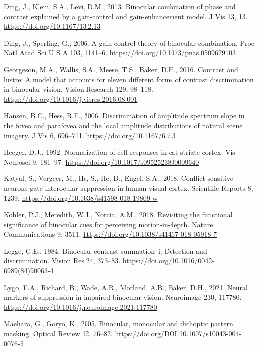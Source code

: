 \documentclass[
  12pt,
]{article}
\newlength{\cslhangindent}
\newenvironment{CSLReferences}[2] %
 {\begin{list}{}{%
  \setlength{\itemindent}{0pt}
  \setlength{\leftmargin}{0pt}
  \setlength{\parsep}{0pt}
  \ifodd #1
   \setlength{\leftmargin}{\cslhangindent}
   \setlength{\itemindent}{-1\cslhangindent}
  \fi
  \setlength{\itemsep}{#2\baselineskip}}}
 {\end{list}}
\begin{document}
\begin{CSLReferences}{1}{0}
Ding, J., Klein, S.A., Levi, D.M., 2013. Binocular combination of phase
and contrast explained by a gain-control and gain-enhancement model. J
Vis 13, 13. \url{https://doi.org/10.1167/13.2.13}

Ding, J., Sperling, G., 2006. A gain-control theory of binocular
combination. Proc Natl Acad Sci U S A 103, 1141--6.
\url{https://doi.org/10.1073/pnas.0509629103}

Georgeson, M.A., Wallis, S.A., Meese, T.S., Baker, D.H., 2016. Contrast
and lustre: A model that accounts for eleven different forms of contrast
discrimination in binocular vision. Vision Research 129, 98--118.
\url{https://doi.org/10.1016/j.visres.2016.08.001}

Hansen, B.C., Hess, R.F., 2006. Discrimination of amplitude spectrum
slope in the fovea and parafovea and the local amplitude distributions
of natural scene imagery. J Vis 6, 696--711.
\url{https://doi.org/10.1167/6.7.3}

Heeger, D.J., 1992. Normalization of cell responses in cat striate
cortex. Vis Neurosci 9, 181--97.
\url{https://doi.org/10.1017/s0952523800009640}

Katyal, S., Vergeer, M., He, S., He, B., Engel, S.A., 2018.
Conflict-sensitive neurons gate interocular suppression in human visual
cortex. Scientific Reports 8, 1239.
\url{https://doi.org/10.1038/s41598-018-19809-w}

Kohler, P.J., Meredith, W.J., Norcia, A.M., 2018. Revisiting the
functional significance of binocular cues for perceiving
motion-in-depth. Nature Communications 9, 3511.
\url{https://doi.org/10.1038/s41467-018-05918-7}

Legge, G.E., 1984. Binocular contrast summation--i. Detection and
discrimination. Vision Res 24, 373--83.
\url{https://doi.org/10.1016/0042-6989(84)90063-4}

Lygo, F.A., Richard, B., Wade, A.R., Morland, A.B., Baker, D.H., 2021.
Neural markers of suppression in impaired binocular vision. Neuroimage
230, 117780. \url{https://doi.org/10.1016/j.neuroimage.2021.117780}

Maehara, G., Goryo, K., 2005. Binocular, monocular and dichoptic pattern
masking. Optical Review 12, 76--82.
\href{https://doi.org/DOI\%2010.1007/s10043-004-0076-5}{https://doi.org/DOI
10.1007/s10043-004-0076-5}


\end{CSLReferences}
\end{document}
